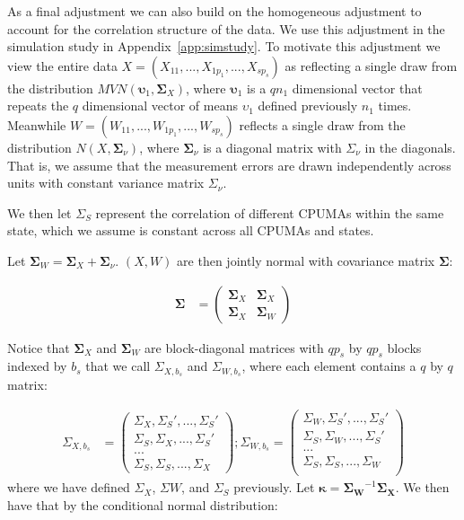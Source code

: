 As a final adjustment we can also build on the homogeneous adjustment to account for the correlation structure of the data. We use this adjustment in the simulation study in Appendix~\ref{app:simstudy}. To motivate this adjustment we view the entire data $X = (X_{11}, ..., X_{1p_1}, ..., X_{sp_s})$ as reflecting a single draw from the distribution $MVN(\boldsymbol{\upsilon}_1, \mathbf{\Sigma}_X)$, where $\boldsymbol{\upsilon}_1$ is a $qn_1$ dimensional vector that repeats the $q$ dimensional vector of means $\upsilon_1$ defined previously $n_1$ times. Meanwhile $W = (W_{11}, ..., W_{1p_1}, ..., W_{sp_s})$ reflects a single draw from the distribution $N(X, \boldsymbol{\Sigma}_{\nu})$, where $\boldsymbol{\Sigma}_{\nu}$ is a diagonal matrix with $\Sigma_{\nu}$ in the diagonals. That is, we assume that the measurement errors are drawn independently across units with constant variance matrix $\Sigma_{\nu}$.

We then let $\Sigma_S$ represent the correlation of different CPUMAs within the same state, which we assume is constant across all CPUMAs and states. 

Let $\boldsymbol{\Sigma}_W = \boldsymbol{\Sigma}_X + \boldsymbol{\Sigma}_{\nu}$. $(X, W)$ are then jointly normal with covariance matrix $\boldsymbol{\Sigma}$: 

\begin{align*}
\boldsymbol{\Sigma} &= \begin{pmatrix}
\mathbf{\Sigma}_X & \mathbf{\Sigma}_X \\
\mathbf{\Sigma}_X & \mathbf{\Sigma}_W
\end{pmatrix} 
\end{align*}

Notice that $\mathbf{\Sigma}_X$ and $\mathbf{\Sigma}_W$ are block-diagonal matrices with $qp_s$ by $qp_s$ blocks indexed by $b_s$ that we call $\Sigma_{X, b_s}$ and $\Sigma_{W, b_s}$, where each element contains a $q$ by $q$ matrix: 

\begin{align*}
\Sigma_{X, b_s} &= \begin{pmatrix}
\Sigma_{X}, \Sigma_{S}', ..., \Sigma_{S}' \\
\Sigma_{S}, \Sigma_{X}, ..., \Sigma_{S}' \\
... \\
\Sigma_{S}, \Sigma_{S}, ..., \Sigma_{X}
\end{pmatrix};
\Sigma_{W, b_s} = \begin{pmatrix}
\Sigma_{W}, \Sigma_{S}', ..., \Sigma_{S}' \\
\Sigma_{S}, \Sigma_{W}, ..., \Sigma_{S}' \\
... \\
\Sigma_{S}, \Sigma_{S}, ..., \Sigma_{W} \\
\end{pmatrix}
\end{align*}
%
where we have defined $\Sigma_{X}$, $\Sigma{W}$, and $\Sigma_{S}$ previously. 
Let $\boldsymbol{\kappa} = \mathbf{\Sigma_W}^{-1}\mathbf{\Sigma_X}$. We then have that by the conditional normal distribution:

